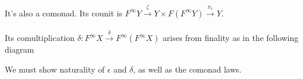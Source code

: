 \documentclass{article}
\begin{document}
\begin{center}
\end{center}  

It's also a comonad. Its counit is 
$F^{\infty}Y \overset{\zeta}{\longrightarrow} Y \times F(F^{\infty} Y) \overset{\pi_1}{\longrightarrow} Y$.
\\~\\
Its comultiplication $\delta : F^{\infty} X \overset{\delta}{\longrightarrow} F^{\infty}(F^{\infty}X)$
arises from finality as in the following diagram
\begin{center}
\end{center}

We must show naturality of $\epsilon$ and $\delta$, as well as the comonad laws.
\end{document}
